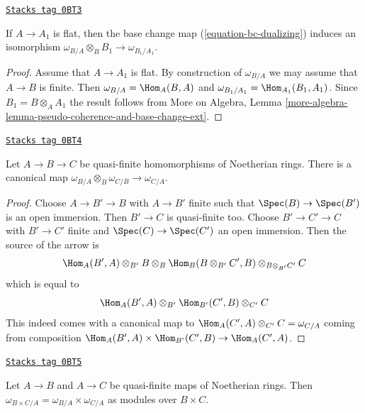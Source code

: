 \begin{lemma}
\label{discriminant-lemma-dualizing-flat-base-change}
\href{https://stacks.math.columbia.edu/tag/0BT3}{\texttt{Stacks tag 0BT3}}

If $A \to A_1$ is flat, then
the base change map (\ref{equation-bc-dualizing}) induces an isomorphism
$\omega_{B/A} \otimes_B B_1 \to \omega_{B_1/A_1}$.
\end{lemma}

\begin{proof}
Assume that $A \to A_1$ is flat. By construction of $\omega_{B/A}$ we may
assume that $A \to B$ is finite. Then $\omega_{B/A} = \Hom_A(B, A)$ and
$\omega_{B_1/A_1} = \Hom_{A_1}(B_1, A_1)$. Since $B_1 = B \otimes_A A_1$
the result follows from More on Algebra, Lemma
\ref{more-algebra-lemma-pseudo-coherence-and-base-change-ext}.
\end{proof}

\begin{lemma}
\label{discriminant-lemma-dualizing-composition}
\href{https://stacks.math.columbia.edu/tag/0BT4}{\texttt{Stacks tag 0BT4}}

Let $A \to B \to C$ be quasi-finite homomorphisms of Noetherian rings.
There is a canonical map
$\omega_{B/A} \otimes_B \omega_{C/B} \to \omega_{C/A}$.
\end{lemma}

\begin{proof}
Choose $A \to B' \to B$ with $A \to B'$ finite such that
$\Spec(B) \to \Spec(B')$ is an open immersion. Then
$B' \to C$ is quasi-finite too. Choose $B' \to C' \to C$
with $B' \to C'$ finite and $\Spec(C) \to \Spec(C')$ an
open immersion. Then the source of the arrow is
$$
\Hom_A(B', A) \otimes_{B'} B \otimes_B
\Hom_B(B \otimes_{B'} C', B) \otimes_{B \otimes_{B'} C'} C
$$
which is equal to
$$
\Hom_A(B', A) \otimes_{B'}
\Hom_{B'}(C', B) \otimes_{C'} C
$$
This indeed comes with a canonical map to
$\Hom_A(C', A) \otimes_{C'} C = \omega_{C/A}$
coming from composition
$\Hom_A(B', A) \times \Hom_{B'}(C', B) \to \Hom_A(C', A)$.
\end{proof}

\begin{lemma}
\label{discriminant-lemma-dualizing-product}
\href{https://stacks.math.columbia.edu/tag/0BT5}{\texttt{Stacks tag 0BT5}}

Let $A \to B$ and $A \to C$ be quasi-finite maps of Noetherian rings.
Then $\omega_{B \times C/A} = \omega_{B/A} \times \omega_{C/A}$
as modules over $B \times C$.
\end{lemma}

